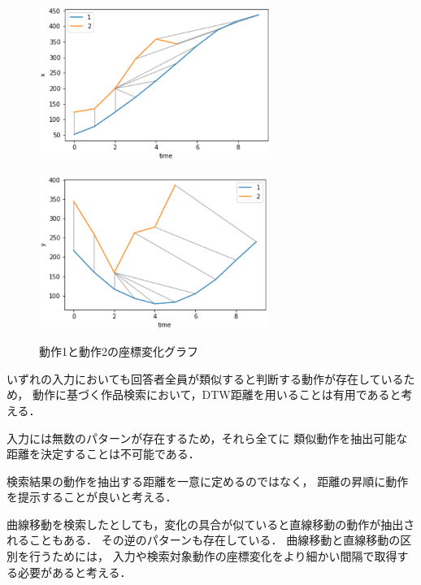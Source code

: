 \documentclass[11pt]{jreport}
\begin{document}
\begin{figure}[H]
    \centering
    \begin{minipage}{0.45\linewidth}
        \centering
        \includegraphics[height=5cm]{1-2-x.eps}
        \label{1-2-x}
    \end{minipage}
    \hspace{0.04\columnwidth}
    \begin{minipage}{0.45\linewidth}
        \centering
        \includegraphics[height=5cm]{1-2-y.eps}
        \label{1-2-y}
    \end{minipage}
    \hspace{0.04\columnwidth}
    \caption{動作1と動作2の座標変化グラフ}
    \label{1-2}
\end{figure}

いずれの入力においても回答者全員が類似すると判断する動作が存在しているため，
動作に基づく作品検索において，DTW距離を用いることは有用であると考える．

入力には無数のパターンが存在するため，それら全てに
類似動作を抽出可能な距離を決定することは不可能である．

検索結果の動作を抽出する距離を一意に定めるのではなく，
距離の昇順に動作を提示することが良いと考える．

曲線移動を検索したとしても，変化の具合が似ていると直線移動の動作が抽出されることもある．
その逆のパターンも存在している．
曲線移動と直線移動の区別を行うためには，
入力や検索対象動作の座標変化をより細かい間隔で取得する必要があると考える．
\end{document}
